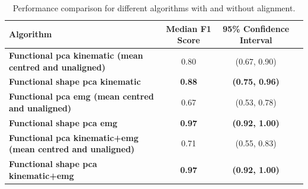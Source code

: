 \documentclass{article}
\begin{document}
\begin{table}
\centering
\begin{tabular}[t]{lccc}
\toprule
Algorithm   & Median F1 Score & 95\% Confidence Interval\\
\midrule
\textbf{Functional pca kinematic (mean centred and unaligned)} & 0.80 & (0.67, 0.90)\\
\textbf{Functional shape pca kinematic} & \textbf{0.88} & \textbf{(0.75, 0.96)}\\
\textbf{Functional pca emg (mean centred and unaligned)} & 0.67 & (0.53, 0.78) \\
\textbf{Functional shape pca emg} & \textbf{0.97} & \textbf{(0.92, 1.00)}\\
\textbf{Functional pca kinematic+emg (mean centred and unaligned)} & 0.71 & (0.55, 0.83)\\
\textbf{Functional shape pca kinematic+emg} & \textbf{0.97} & \textbf{(0.92, 1.00)}\\

\bottomrule
\end{tabular}
\caption{Performance comparison for different algorithms with and without alignment.}
\label{quantitative}
\end{table}











\end{document}
